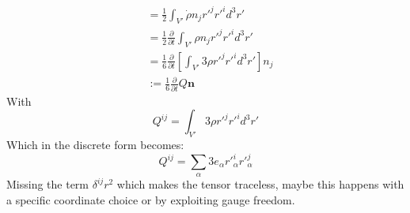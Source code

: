 \documentclass[12pt,a4]{article}
\begin{document}
\begin{enumerate}
\begin{enumerate}
\begin{align*}
                                                              &= \frac{1}{2} \int_{V'} \dot \rho n_j{r'}^j {r'}^i d^3r'\\
                                                              &= \frac{1}{2} \frac{\partial}{\partial t} \int_{V'} \rho n_j{r'}^j {r'}^i d^3r'\\
                                                              &= \frac{1}{6} \frac{\partial}{\partial t} \left[\int_{V'} 3 \rho {r'}^j {r'}^i d^3r'\right]n_j\\
                                                              &:= \frac{1}{6} \frac{\partial}{\partial t} Q \mathbf{n} 
      \end{align*}
      With
      \begin{equation*}
        Q^{ij} = \int_{V'} 3 \rho {r'}^j {r'}^i d^3r'
      \end{equation*}
      Which in the discrete form becomes:
      \begin{equation*}
        Q^{ij} = \sum_\alpha 3 e_\alpha {r'}^i_\alpha {r'}^j_\alpha 
      \end{equation*}
      Missing the term $\delta^{ij}r^2$ which makes the tensor traceless, maybe this happens with a specific coordinate choice or by exploiting gauge freedom.


\end{enumerate}
\end{enumerate}
\end{document}
